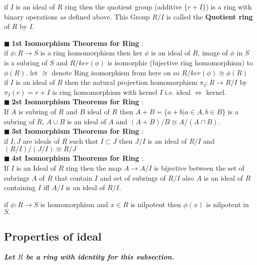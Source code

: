 \documentclass[11pt]{extarticle}
\newcommand{\ra}{\rightarrow}
\newcommand{\tbx}[2][]{
	\begin{tcolorbox}[enhanced,breakable,size=small,colback=black!2!white,title={#1},arc is angular, arc=1.5mm,drop fuzzy shadow]
		#2
	\end{tcolorbox}
}
\newcommand{\y}{$\blacksquare\;$}
\begin{document}
\begin{multicols}{2}
{			} 
\tbx{ if $ I $ is an ideal of $ R $ ring then the quotient group (additive $ \{r+I\} $) is a ring with binary operations as defined above. This Group $ R/I $ is called the \textbf{Quotient ring} of $ R $ by $ I. $
			} 
\tbx[\textbf{Isomorphism Theorems for Ring}]{
			\y \textbf{1st Isomorphism Theorems for Ring} : \\ 
			if $ \phi : R\ra S $ is a ring homomorphism then ker $ \phi $ is an ideal of $ R $, image of $ \phi $ in $ S $ is a subring of $ S $ and $ R/ker(\phi) $ is isomorphic (bijective ring homomorphism) to $ \phi(R) .$ let $ \cong $ denote Ring isomorphism from here on so $ R/ker(\phi)\cong \phi(R) $\\
			if $ I $ is an ideal of $ R $ then the natural projection homomorphism $ \pi_I:R \ra R/I $ by $ \pi_I(r)=r+I $ is ring homomorphism   with kernel $ I $ i.e. ideal $ \iff $ kernel.\\
			\y  \textbf{2st Isomorphism Theorems for Ring} : \\ 
			If $ A $ is subring of $ R $ and $ B $ ideal of  $ R $ then $ A+B=\{a+b|a\in A,b\in B\} $ is a subring of $ R $, $ A\cup B $ is an ideal of $ A $ and $ (A+B)/B\cong A/(A\cap B) .$\\
			\y  \textbf{3st Isomorphism Theorems for Ring} : \\ 
			if $ I,J $ are ideals of $ R $ such that $ I	\subset J $ then $ J/I $ is an ideal of $ R/I $ and $ (R/I)/(J/I)\cong R/J $\\
			\y \textbf{4st Isomorphism Theorems for Ring} :  \\
			If $ I $ is an Ideal of $ R $ ring then the map $ A\ra A/I $ is bijective between the set of subrings $ A $ of $ R $ that contain $ I $ and set of subrings of $ R/I $ also $ A $ is an ideal of $ R $ containing $ I $ iff $ A/I $ is an ideal of $ R/I .$
			} 
\tbx{if $ \phi : R \ra S $ is homomorphism and $ x	\in  R$ is nilpotent then $ \phi(x) $ is nilpotent in $ S. $}
			\subsection{Properties of ideal}
			\textbf{\large \emph{Let $ R $ be a ring with identity for this subsection.}}
			

\end{multicols}
\end{document}
